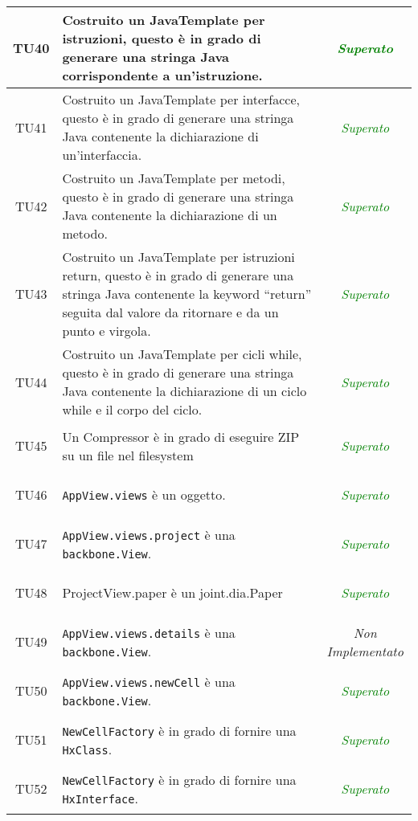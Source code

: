 \begin{longtable}{|c|>{}m{8cm}|c|}
\hypertarget{TU40}{TU40} & Costruito un JavaTemplate per istruzioni, questo è in grado di generare una stringa Java corrispondente a un'istruzione. & \textcolor{Green}{\textit{Superato}}\\ \hline
\hypertarget{TU41}{TU41} & Costruito un JavaTemplate per interfacce, questo è in grado di generare una stringa Java contenente la dichiarazione di un'interfaccia. & \textcolor{Green}{\textit{Superato}}\\ \hline
\hypertarget{TU42}{TU42} & Costruito un JavaTemplate per metodi, questo è in grado di generare una stringa Java contenente la dichiarazione di un metodo. & \textcolor{Green}{\textit{Superato}}\\ \hline
\hypertarget{TU43}{TU43} & Costruito un JavaTemplate per istruzioni return, questo è in grado di generare una stringa Java contenente la keyword ``return'' seguita dal valore da ritornare e da un punto e virgola. & \textcolor{Green}{\textit{Superato}}\\ \hline
\hypertarget{TU44}{TU44} & Costruito un JavaTemplate per cicli while, questo è in grado di generare una stringa Java contenente la dichiarazione di un ciclo while e il corpo del ciclo. & \textcolor{Green}{\textit{Superato}}\\ \hline
\hypertarget{TU45}{TU45} & Un Compressor è in grado di eseguire ZIP su un file nel filesystem & \textcolor{Green}{\textit{Superato}}\\ \hline
\hypertarget{TU46}{TU46} & \texttt{AppView.views} è un oggetto. & \textcolor{Green}{\textit{Superato}}\\ \hline
\hypertarget{TU47}{TU47} & \texttt{AppView.views.project} è una \texttt{backbone.View}. & \textcolor{Green}{\textit{Superato}}\\ \hline
\hypertarget{TU48}{TU48} & ProjectView.paper è un joint.dia.Paper & \textcolor{Green}{\textit{Superato}}\\ \hline
\hypertarget{TU49}{TU49} & \texttt{AppView.views.details} è una \texttt{backbone.View}. & \textit{Non Implementato}\\ \hline
\hypertarget{TU50}{TU50} & \texttt{AppView.views.newCell} è una \texttt{backbone.View}. & \textcolor{Green}{\textit{Superato}}\\ \hline
\hypertarget{TU51}{TU51} & \texttt{NewCellFactory} è in grado di fornire una \texttt{HxClass}. & \textcolor{Green}{\textit{Superato}}\\ \hline
\hypertarget{TU52}{TU52} & \texttt{NewCellFactory} è in grado di fornire una \texttt{HxInterface}. & \textcolor{Green}{\textit{Superato}}\\ \hline

\end{longtable}

